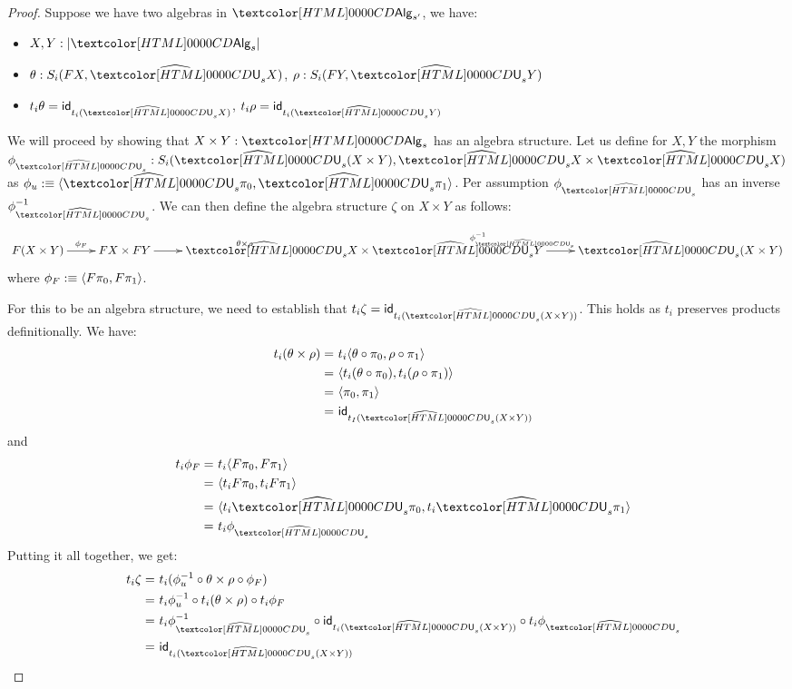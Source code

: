 \begin{proof}
  Suppose we have two algebras in $\Alg_{s'}$, \ie we have:
  \begin{itemize}
  \item $X, Y : | \Alg_s |$
  \item $\theta : S_i(FX,\extendfunc{\Und}_sX)$, $\rho : S_i(FY,\extendfunc{\Und}_sY)$
  \item $t_i \theta = \id_{t_i (\extendfunc{\Und}_s X)}$, $t_i \rho = \id_{t_i (\extendfunc{\Und}_s Y)}$
  \end{itemize}

  We will proceed by showing that $X \times Y : \Alg_s$ has an algebra
  structure. Let us define for $X, Y$ the morphism
  $\phi_{\extendfunc{\Und}_s} : S_i(\extendfunc{\Und}_s(X \times Y), \extendfunc{\Und}_s X \times \extendfunc{\Und}_s X)$ as
  $\phi_u \ddefeq \langle \extendfunc{\Und}_s \pi_0 , \extendfunc{\Und}_s \pi_1 \rangle$. Per assumption
  $\phi_{\extendfunc{\Und}_s}$ has an inverse $\phi_{\extendfunc{\Und}_s}^{-1}$. We can then define the
  algebra structure $\zeta$ on $X \times Y$ as follows:
  $$
  \xymatrix{ 
    F(X \times Y) \ar[r]^{\phi_F}
    &FX \times FY \ar[r]^{\theta \times \rho} 
    &\extendfunc{\Und}_sX \times \extendfunc{\Und}_sY \ar[r]^{\phi_{\extendfunc{\Und}_s}^{-1}} 
    &\extendfunc{\Und}_s(X \times Y) 
  }
  $$
  where $\phi_F :\equiv \langle F \pi_0 , F \pi_1 \rangle$.
  
  For this to be an algebra structure, we need to establish that
  $t_i \zeta = \id_{t_i (\extendfunc{\Und}_s (X \times Y))}$. This holds as
  $t_i$ preserves products definitionally. We have:
  \begin{align*}
    &&t_i (\theta \times \rho) =&\ t_i \langle \theta \circ \pi_0 , \rho \circ \pi_1 \rangle \\
    &&=&\ \langle t_i (\theta \circ \pi_0) , t_i (\rho \circ \pi_1) \rangle \\
    &&=&\ \langle \pi_0 , \pi_1 \rangle \\
    &&=&\ \id_{t_I (\extendfunc{\Und}_s (X \times Y))}
  \end{align*}
  and
  \begin{align*}
    &&t_i \phi_F =&\ t_i \langle F \pi_0 , F \pi_1 \rangle \\
    &&=&\ \langle t_i F \pi_0 , t_i F \pi_1 \rangle \\
    &&=&\ \langle t_i \extendfunc{\Und}_s \pi_0 , t_i \extendfunc{\Und}_s \pi_1 \rangle \\
    &&=&\ t_i \phi_{\extendfunc{\Und}_s}
  \end{align*}
  Putting it all together, we get:
  \begin{align*}
    &&t_i \zeta =&\ t_i (\phi_u^{-1} \circ \theta \times \rho \circ \phi_F) \\
    &&=&\ t_i \phi_u^{-1} \circ t_i (\theta \times \rho) \circ t_i \phi_F \\
    &&=&\ t_i \phi_{\extendfunc{\Und}_s}^{-1} \circ \id_{t_i (\extendfunc{\Und}_s (X \times Y))} \circ t_i \phi_{\extendfunc{\Und}_s} \\
    &&=&\ \id_{t_i (\extendfunc{\Und}_s (X \times Y))}
  \end{align*}


\end{proof}
